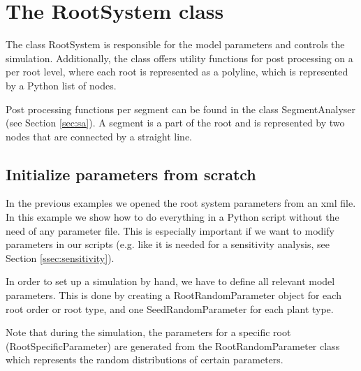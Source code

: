 \newpage
\section{The RootSystem class} \label{sec:rs}

The class RootSystem is responsible for the model parameters and controls the simulation. Additionally, the class offers utility functions for post processing on a per root level, where each root is represented as a polyline, which is represented by a Python list of nodes. 

Post processing functions per segment can be found in the class SegmentAnalyser (see Section \ref{sec:sa}). A segment is a part of the root and is represented by two nodes that are connected by a straight line.



\subsection{Initialize parameters from scratch} \label{sec:from_scratch}
 
In the previous examples we opened the root system parameters from an xml file. In this example we show how to do everything in a Python script without the need of any parameter file. This is especially important if we want to modify parameters in our scripts (e.g. like it is needed for a sensitivity analysis, see Section \ref{ssec:sensitivity}).

In order to set up a simulation by hand, we have to define all relevant model parameters. This is done by creating a RootRandomParameter object for each root order or root type, and one SeedRandomParameter for each plant type. 

Note that during the simulation, the parameters for a specific root (RootSpecificParameter) are generated from the RootRandomParameter class which represents the random distributions of certain parameters.



